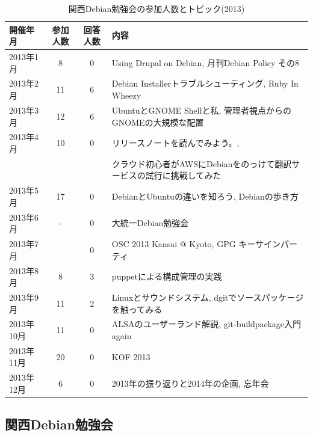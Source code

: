 \documentclass[mingoth,a4paper]{jsarticle}
\begin{document}
\begin{table}
    \caption{関西Debian勉強会の参加人数とトピック(2013)}
    \label{tab:count2013kansai}
    \begin{center}
      \begin{tabular}{|l|c|c|l|}
        \hline
        開催年月  & 参加人数 & 回答人数 & 内容 \\
        \hline
        2013年1月 & 8        &0         & Using Drupal on Debian, 月刊Debian Policy その8 \\
        2013年2月 &11        &6         & Debian Installerトラブルシューティング, Ruby In Wheezy \\
        2013年3月 &12        &6         & UbuntuとGNOME Shellと私, 管理者視点からのGNOMEの大規模な配置 \\
        2013年4月 &10        &0         & リリースノートを読んでみよう。, \\
                  &          &          & クラウド初心者がAWSにDebianをのっけて翻訳サービスの試行に挑戦してみた \\
        2013年5月 &17        &0         & DebianとUbuntuの違いを知ろう, Debianの歩き方 \\
        2013年6月 & -        &0         & 大統一Debian勉強会 \\
        2013年7月 &          &0         & OSC 2013 Kansai @ Kyoto, GPG キーサインパーティ\\
        2013年8月 & 8        &3         & puppetによる構成管理の実践 \\
        2013年9月 &11        &2         & Linuxとサウンドシステム, dgitでソースパッケージを触ってみる \\
        2013年10月&11        &0         & ALSAのユーザーランド解説, git-buildpackage入門again \\
        2013年11月&20        &0         & KOF 2013 \\
        2013年12月& 6        &0         & 2013年の振り返りと2014年の企画, 忘年会 \\
        \hline
      \end{tabular}
    \end{center}
\end{table}

\clearpage


\subsection{関西Debian勉強会}
\end{document}
